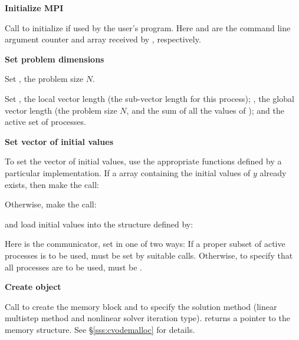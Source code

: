 \begin{Steps}
  
\item 
  {\bf {\p} Initialize MPI}

  Call  to initialize {\mpi} if used by
  the user's program. Here  and  are the command line
  argument counter and array received by , respectively.
  
\item
  {\bf Set problem dimensions}

  {\s} Set , the problem size $N$.

  {\p} Set , the local vector length (the sub-vector
  length for this process); , the global vector length (the
  problem size $N$, and the sum of all the values of );
  and the active set of processes.
  
\item
  {\bf Set vector of initial values}
 
  To set the vector  of initial values, use the appropriate functions defined by a
  particular {\nvector} implementation.  If a  array 
  containing the initial values of $y$ already exists, then make the call:

  {\s} 

  {\p} 

  Otherwise, make the call:

  {\s} 

  {\p} 

  and load initial values into the structure defined by:

  {\s} 

  {\p} 

  Here  is the {\mpi} communicator, set in one of two ways: 
  If a proper subset of active processes is to be used,  
  must be set by suitable {\mpi} calls. Otherwise, to specify that all 
  processes are to be used,  must be .
  
\item\label{i:cvode_create} 
  {\bf Create {\cvodes} object}

  Call  
  to create the {\cvodes} memory block and to specify the solution method
  (linear multistep method and nonlinear solver iteration type).
   returns a pointer to the {\cvodes} memory structure.
  See \S\ref{sss:cvodemalloc} for details.


\end{Steps}
